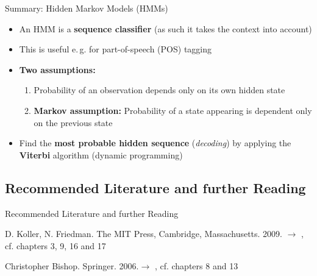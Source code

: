 \begin{frame}{Summary: Hidden Markov Models (HMMs)}{}
	\begin{itemize}
		\item An HMM is a \textbf{sequence classifier} (as such it takes the context into account)
		\item This is useful e.\,g. for part-of-speech (POS) tagging
		\item \textbf{Two assumptions:}
		\begin{enumerate}
			\item Probability of an observation depends only on its own hidden state
			\item \textbf{Markov assumption:} Probability of a state appearing is dependent only on the previous state
		\end{enumerate}
		\item Find the \textbf{most probable hidden sequence} (\textit{decoding}) by applying the \textbf{Viterbi} algorithm
			(dynamic programming)
	\end{itemize}
\end{frame}


\subsection{Recommended Literature and further Reading}

\begin{frame}[allowframebreaks]{Recommended Literature and further Reading}{}
	\footnotesize
	\begin{thebibliography}{2}		
			{D. Koller, N. Friedman. The MIT Press, Cambridge, Massachusetts. 2009.}
			{$\rightarrow$ \href{
				https://github.com/Zhenye-Na/machine-learning-uiuc/blob/master/docs/Probabilistic\%20Graphical\%20Models\%20-\%20Principles\%20and\%20Techniques.pdf
			}{}, cf. chapters 3, 9, 16 and 17}
			
			{Christopher Bishop. Springer. 2006.}{$\rightarrow$ \href{
				http://users.isr.ist.utl.pt/~wurmd/Livros/school/Bishop\%20-\%20Pattern\%20Recognition\%20And\%20Machine\%20Learning\%20-\%20Springer\%20\%202006.pdf
			}{}, cf. chapters 8 and 13}
	\end{thebibliography}
\end{frame}


\makethanks

